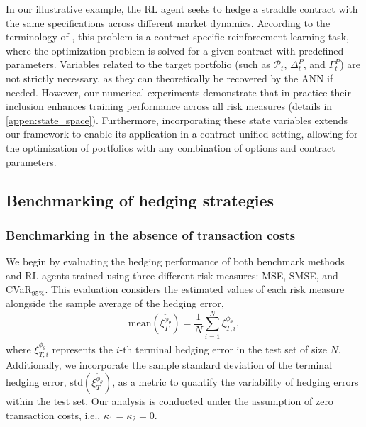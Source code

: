\documentclass[12pt]{article}
\begin{document}
In our illustrative example, the RL agent seeks to hedge a straddle contract with the same specifications across different market dynamics. According to the terminology of \cite{peng2024risksensitivecontractunifiedreinforcement}, this problem is a contract-specific reinforcement learning task, where the optimization problem is solved for a given contract with predefined parameters. Variables related to the target portfolio (such as $\mathcal{P}_{t}$, $\Delta_{t}^{P}$, and $\Gamma_{t}^{P}$) are not strictly necessary, as they can theoretically be recovered by the ANN if needed.
However, our numerical experiments demonstrate that in practice their inclusion enhances training performance across all risk measures (details in \cref{appen:state_space}).
Furthermore, incorporating these state variables extends our framework to enable its application in a contract-unified setting, allowing for the optimization of portfolios with any combination of options and contract parameters.

\subsection{Benchmarking of hedging strategies}

\subsubsection{Benchmarking in the absence of transaction costs}\label{subsub:benchmarking_notc}
We begin by evaluating the hedging performance of both benchmark methods and RL agents trained using three different risk measures: MSE, SMSE, and CVaR$_{95\%}$.
This evaluation considers the estimated values of each risk measure alongside the sample average of the hedging error, $$\text{mean}\left(\xi_{T}^{\tilde{\phi}_{\theta}}\right) = \frac{1}{N}\sum_{i=1}^{N} \xi_{T,i}^{\tilde{\phi}_{\theta}},$$ 
where $\xi_{T,i}^{\tilde{\phi}_{\theta}}$ represents the $i$-th terminal hedging error in the test set of size $N$. Additionally, we incorporate the sample standard deviation of the terminal hedging error, $\text{std}\left(\xi_{T}^{\tilde{\phi}_{\theta}}\right)$, as a metric to quantify the variability of hedging errors within the test set. Our analysis is conducted under the assumption of zero transaction costs, i.e., $\kappa_{1}=\kappa_{2}=0$.
\end{document}
